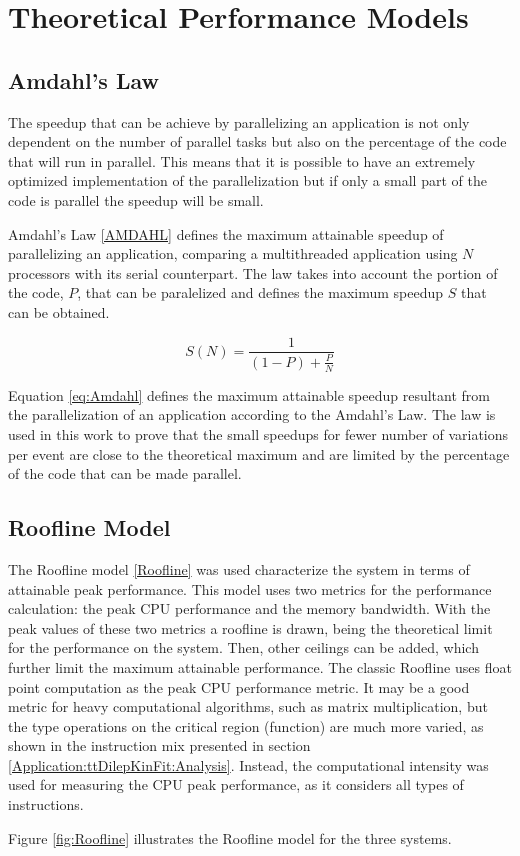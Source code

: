\appendix
{}
\chapter{Theoretical Performance Models}

\section{Amdahl's Law}
\label{AmdahlsLaw}

The speedup that can be achieve by parallelizing an application is not only dependent on the number of parallel tasks but also on the percentage of the code that will run in parallel. This means that it is possible to have an extremely optimized implementation of the parallelization but if only a small part of the code is parallel the speedup will be small.

Amdahl's Law \ref{AMDAHL} defines the maximum attainable speedup of parallelizing an application, comparing a multithreaded application using $N$ processors with its serial counterpart. The law takes into account the portion of the code, $P$, that can be paralelized and defines the maximum speedup $S$ that can be obtained.

\begin{center}
	\begin{equation}
		S(N) = \frac{1}{(1 - P) + \frac{P}{N}}
		\label{eq:Amdahl}
	\end{equation}
\end{center}

Equation \ref{eq:Amdahl} defines the maximum attainable speedup resultant from the parallelization of an application according to the Amdahl's Law. The law is used in this work to prove that the small speedups for fewer number of variations per event are close to the theoretical maximum and are limited by the percentage of the code that can be made parallel.

\section{Roofline Model}
\label{App:Roofline}

The Roofline model \ref{Roofline} was used characterize the system in terms of attainable peak performance. This model uses two metrics for the performance calculation: the peak CPU performance and the memory bandwidth. With the peak values of these two metrics a roofline is drawn, being the theoretical limit for the performance on the system. Then, other ceilings can be added, which further limit the maximum attainable performance. The classic Roofline uses float point computation as the peak CPU performance metric. It may be a good metric for heavy computational algorithms, such as matrix multiplication, but the type operations on the critical region (\ttDilepKinFit function) are much more varied, as shown in the instruction mix presented in section \ref{Application:ttDilepKinFit:Analysis}. Instead, the computational intensity was used for measuring the CPU peak performance, as it considers all types of instructions.

Figure \ref{fig:Roofline} illustrates the Roofline model for the three systems.

